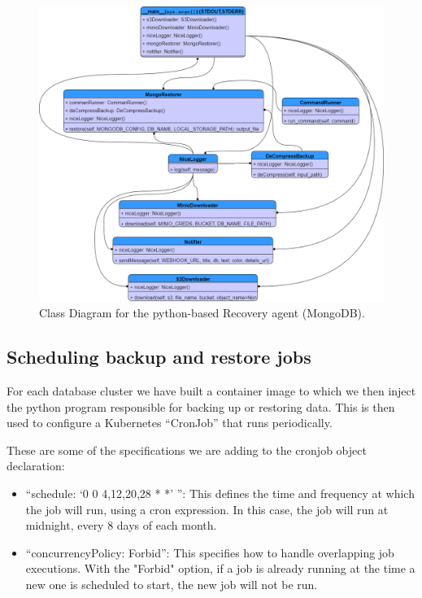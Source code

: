 \begin{figure}[H]\centering
\includegraphics[width=1.0\textwidth,angle=00]{assets/f60.png}
\caption{Class Diagram for the python-based Recovery agent (MongoDB).}
\label{fig:f60}
\end{figure}

\subsection{ Scheduling backup and restore jobs }

\hspace{7mm}For each database cluster we have built a container image to which we then inject the python program responsible for backing up or restoring data. This is then used to configure a Kubernetes “CronJob” that runs periodically.

\hspace{7mm}These are some of the specifications we are adding to the cronjob object declaration: 
\begin{itemize}[label={--}]
\item “schedule: ‘0 0 4,12,20,28 * *’ ”: This defines the time and frequency at which the job will run, using a cron expression. In this case, the job will run at midnight, every 8 days of each month. 
\item  “concurrencyPolicy: Forbid”: This specifies how to handle overlapping job executions. With the "Forbid" option, if a job is already running at the time a new one is scheduled to start, the new job will not be run. 
\end{itemize}

